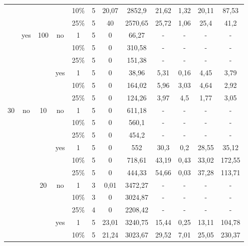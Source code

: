\begin{table}[h!]
{\begin{tabular}{cccccccccccc}
            &   &   &   & 10\% & 5 & 20,07 & 2852,9 & 21,62 & 1,32 & 20,11 & 87,53 \\
            &   &   &   & 25\% & 5 & 40 & 2570,65 & 25,72 & 1,06 & 25,4 & 41,2 \bigstrut[b]\\
            \cline{2-12}      & \multirow{6}[4]{*}{yes} & \multirow{6}[4]{*}{100} & \multirow{3}[2]{*}{no} & 1 & 5 & 0 & 66,27 & - & - & - & - \bigstrut[t]\\
            &   &   &   & 10\% & 5 & 0 & 310,58 & - & - & - & - \\
            &   &   &   & 25\% & 5 & 0 & 151,38 & - & - & - & - \bigstrut[b]\\
            \cline{4-12}      &   &   & \multirow{3}[2]{*}{yes} & 1 & 5 & 0 & 38,96 & 5,31 & 0,16 & 4,45 & 3,79 \bigstrut[t]\\
            &   &   &   & 10\% & 5 & 0 & 164,02 & 5,96 & 3,03 & 4,64 & 2,92 \\
            &   &   &   & 25\% & 5 & 0 & 124,26 & 3,97 & 4,5 & 1,77 & 3,05 \bigstrut[b]\\
            \hline
            \multirow{24}[16]{*}{30} & \multirow{18}[12]{*}{no} & \multirow{6}[4]{*}{10} & \multirow{3}[2]{*}{no} & 1 & 5 & 0 & 611,18 & - & - & - & - \bigstrut[t]\\
            &   &   &   & 10\% & 5 & 0 & 560,1 & - & - & - & - \\
            &   &   &   & 25\% & 5 & 0 & 454,2 & - & - & - & - \bigstrut[b]\\
            \cline{4-12}      &   &   & \multirow{3}[2]{*}{yes} & 1 & 5 & 0 & 552 & 30,3 & 0,2 & 28,55 & 35,12 \bigstrut[t]\\
            &   &   &   & 10\% & 5 & 0 & 718,61 & 43,19 & 0,43 & 33,02 & 172,55 \\
            &   &   &   & 25\% & 5 & 0 & 444,33 & 54,66 & 0,03 & 37,28 & 113,71 \bigstrut[b]\\
            \cline{3-12}      &   & \multirow{6}[4]{*}{20} & \multirow{3}[2]{*}{no} & 1 & 3 & 0,01 & 3472,27 & - & - & - & - \bigstrut[t]\\
            &   &   &   & 10\% & 3 & 0 & 3024,87 & - & - & - & - \\
            &   &   &   & 25\% & 4 & 0 & 2208,42 & - & - & - & - \bigstrut[b]\\
            \cline{4-12}      &   &   & \multirow{3}[2]{*}{yes} & 1 & 5 & 23,01 & 3240,75 & 15,44 & 0,25 & 13,11 & 104,78 \bigstrut[t]\\
            &   &   &   & 10\% & 5 & 21,24 & 3023,67 & 29,52 & 7,01 & 25,05 & 230,37 \\

\end{tabular}}
\end{table}
